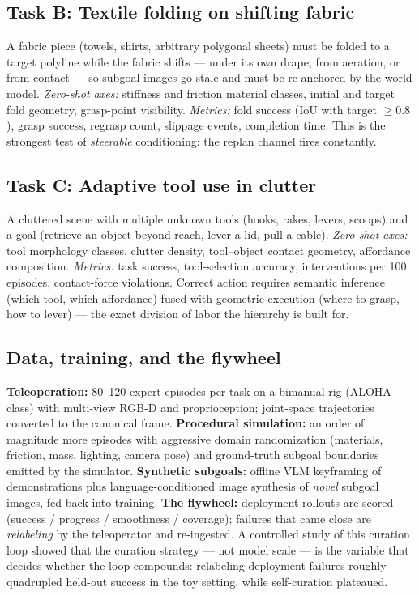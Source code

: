 \documentclass[11pt,a4paper]{article}
\begin{document}
\subsection{Task B: Textile folding on shifting fabric}
\label{sec:taskB}
A fabric piece (towels, shirts, arbitrary polygonal sheets) must be folded to a
target polyline while the fabric shifts --- under its own drape, from aeration,
or from contact --- so subgoal images go stale and must be re-anchored by the
world model. \emph{Zero-shot axes:} stiffness and friction material classes,
initial and target fold geometry, grasp-point visibility. \emph{Metrics:} fold
success (IoU with target $\ge 0.8$), grasp success, regrasp count, slippage
events, completion time. This is the strongest test of \emph{steerable}
conditioning: the replan channel fires constantly.

\subsection{Task C: Adaptive tool use in clutter}
\label{sec:taskC}
A cluttered scene with multiple unknown tools (hooks, rakes, levers, scoops) and
a goal (retrieve an object beyond reach, lever a lid, pull a cable).
\emph{Zero-shot axes:} tool morphology classes, clutter density, tool--object
contact geometry, affordance composition. \emph{Metrics:} task success,
tool-selection accuracy, interventions per 100 episodes, contact-force
violations. Correct action requires semantic inference (which tool, which
affordance) fused with geometric execution (where to grasp, how to lever) --- the
exact division of labor the hierarchy is built for.

\subsection{Data, training, and the flywheel}
\label{sec:data}
\textbf{Teleoperation:} 80--120 expert episodes per task on a bimanual rig
(ALOHA-class) with multi-view RGB-D and proprioception; joint-space trajectories
converted to the canonical frame. \textbf{Procedural simulation:} an order of
magnitude more episodes with aggressive domain randomization (materials, friction,
mass, lighting, camera pose) and ground-truth subgoal boundaries emitted by the
simulator. \textbf{Synthetic subgoals:} offline VLM keyframing of demonstrations
plus language-conditioned image synthesis of \emph{novel} subgoal images, fed
back into training. \textbf{The flywheel:} deployment rollouts are scored
(success / progress / smoothness / coverage); failures that came close are
\emph{relabeling} by the teleoperator and re-ingested. A controlled study of this
curation loop \cite{datafly} showed that the curation strategy --- not model
scale --- is the variable that decides whether the loop compounds: relabeling
deployment failures roughly quadrupled held-out success in the toy setting, while
self-curation plateaued.
\end{document}

